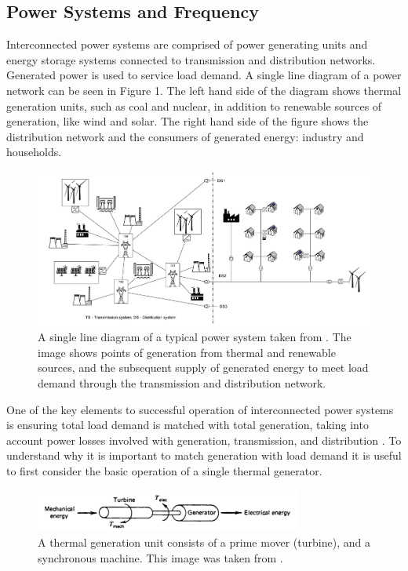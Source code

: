 \documentclass[12pt, a4paper]{article}
\begin{document}
\subsection{Power Systems and Frequency}
Interconnected power systems are comprised of power generating units and energy storage systems connected to transmission and distribution networks. Generated power is used to service load demand. A single line diagram of a power network can be seen in Figure 1. The left hand side of the diagram shows thermal generation units, such as coal and nuclear, in addition to renewable sources of generation, like wind and solar. The right hand side of the figure shows the distribution network and the consumers of generated energy: industry and households.
\begin{figure}[h]
	\centering
	\includegraphics[scale=0.85]{power_system}
	\caption{A single line diagram of a typical power system taken from \cite{Glavic2019}. The image shows points of generation from thermal and renewable sources, and the subsequent supply of generated energy to meet load demand through the transmission and distribution network.}
\end{figure}

One of the key elements to successful operation of interconnected power systems is ensuring total load demand is matched with total generation, taking into account power losses involved with generation, transmission, and distribution \cite{Wood2013}. To understand why it is important to match generation with load demand it is useful to first consider the basic operation of a single thermal generator. 
\begin{figure}[h]
\centering
\includegraphics[height=1.4cm]{generation}
\caption{A thermal generation unit consists of a prime mover (turbine), and a synchronous machine. This image was taken from \cite{Wood2013}.}
\end{figure}
\end{document}
